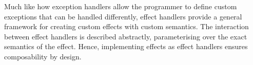


Much like how exception handlers allow the programmer to define custom exceptions that can be handled differently, effect handlers provide a general framework for creating custom effects with custom semantics. The interaction between effect handlers is described abstractly, parameterising over the exact semantics of the effect. Hence, implementing effects as effect handlers ensures composability by design. 

